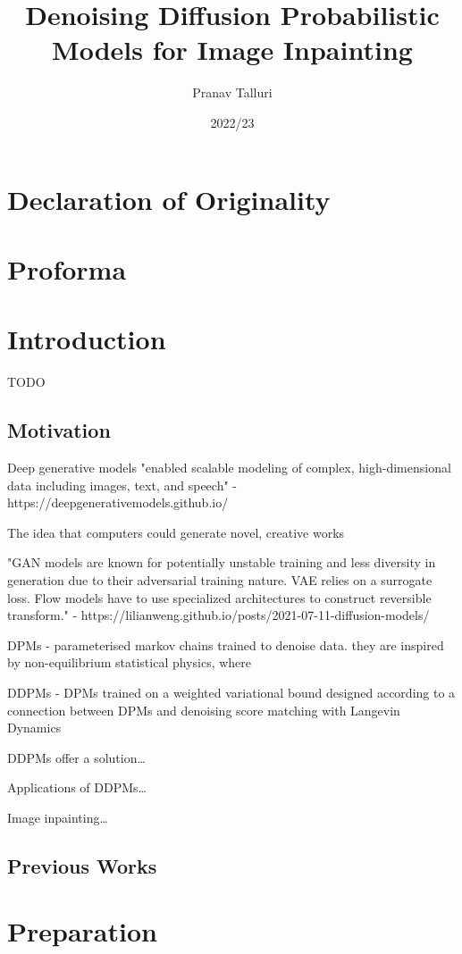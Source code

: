 \documentclass{article}
\title{Denoising Diffusion Probabilistic Models for Image Inpainting}
\author{Pranav Talluri}
\date{2022/23}
\begin{document}
\maketitle
\newpage
\section*{Declaration of Originality}
\newpage
\section*{Proforma}
\newpage
\tableofcontents
\newpage
\section{Introduction}

TODO

\subsection{Motivation}

Deep generative models "enabled scalable modeling of complex, high-dimensional data including images, text, and speech" - https://deepgenerativemodels.github.io/

The idea that computers could generate novel, creative works 

"GAN models are known for potentially unstable training and less diversity in generation due to their adversarial training nature. VAE relies on a surrogate loss. Flow models have to use specialized architectures to construct reversible transform." - https://lilianweng.github.io/posts/2021-07-11-diffusion-models/

DPMs - parameterised markov chains trained to denoise data. they are inspired by non-equilibrium statistical physics, where 

DDPMs - DPMs trained on a weighted variational bound designed according to a connection between DPMs and denoising score matching with Langevin Dynamics

DDPMs offer a solution\dots

Applications of DDPMs\dots

Image inpainting\dots

\subsection{Previous Works}

\newpage
\section{Preparation}
\end{document}
